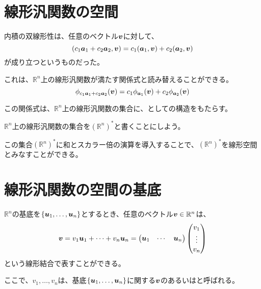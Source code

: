 \documentclass[../../../topic_linear-algebra]{subfiles}
\begin{document}
\sectionline
\section{線形汎関数の空間}

内積の双線形性は、任意のベクトル$\vb*{v}$に対して、
\begin{equation*}
  (c_1 \vb*{a}_1 + c_2 \vb*{a}_2, \vb*{v}) = c_1 (\vb*{a}_1, \vb*{v}) + c_2 (\vb*{a}_2, \vb*{v})
\end{equation*}
が成り立つというものだった。

\br

これは、$\mathbb{R}^n$上の線形汎関数が満たす関係式と読み替えることができる。
\begin{equation*}
  \phi_{c_1 \vb*{a}_1 + c_2 \vb*{a}_2}(\vb*{v}) = c_1 \phi_{\vb*{a}_1}(\vb*{v}) + c_2 \phi_{\vb*{a}_2}(\vb*{v})
\end{equation*}

この関係式は、$\mathbb{R}^n$上の線形汎関数の集合に、としての構造をもたらす。

\br

$\mathbb{R}^n$上の線形汎関数の集合を$(\mathbb{R}^n)^*$と書くことにしよう。

この集合$(\mathbb{R}^n)^*$に和とスカラー倍の演算を導入することで、$(\mathbb{R}^n)^*$を線形空間とみなすことができる。

\sectionline
\section{線形汎関数の空間の基底}

$\mathbb{R}^n$の基底を$\{ \vb*{u}_1, \ldots, \vb*{u}_n \}$とするとき、任意のベクトル$\vb*{v} \in \mathbb{R}^n$は、
\begin{equation*}
  \vb*{v} = v_1 \vb*{u}_1 + \cdots + v_n \vb*{u}_n = \begin{pmatrix}
    \vb*{u}_1 & \cdots & \vb*{u}_n
  \end{pmatrix} \begin{pmatrix}
    v_1 \\
    \vdots \\
    v_n
  \end{pmatrix}
\end{equation*}
という線形結合で表すことができる。

ここで、$v_1, \ldots, v_n$は、基底$\{\vb*{u}_1, \ldots, \vb*{u}_n\}$に関する$\vb*{v}$のあるいはと呼ばれる。

\br
\end{document}
